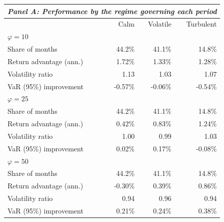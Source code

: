 \begin{tabular*}{\textwidth}{l@{\extracolsep{\fill}}rrr}
\toprule
\multicolumn{4}{c}{\textit{Panel A: Performance by the regime governing each period}} \\
\midrule
 & Calm & Volatile & Turbulent \\
\midrule
\multicolumn{4}{l}{\textit{$\varphi = 10$}} \\
\midrule
Share of months & 44.2\% & 41.1\% & 14.8\% \\
Return advantage (ann.) & 1.72\% & 1.33\% & 1.28\% \\
Volatility ratio & 1.13 & 1.03 & 1.07 \\
VaR (95\%) improvement & -0.57\% & -0.06\% & -0.54\% \\
\midrule
\multicolumn{4}{l}{\textit{$\varphi = 25$}} \\
\midrule
Share of months & 44.2\% & 41.1\% & 14.8\% \\
Return advantage (ann.) & 0.42\% & 0.83\% & 1.24\% \\
Volatility ratio & 1.00 & 0.99 & 1.03 \\
VaR (95\%) improvement & 0.02\% & 0.17\% & -0.08\% \\
\midrule
\multicolumn{4}{l}{\textit{$\varphi = 50$}} \\
\midrule
Share of months & 44.2\% & 41.1\% & 14.8\% \\
Return advantage (ann.) & -0.30\% & 0.39\% & 0.86\% \\
Volatility ratio & 0.94 & 0.96 & 0.94 \\
VaR (95\%) improvement & 0.21\% & 0.24\% & 0.38\% \\
\midrule[\heavyrulewidth]
\end{tabular*}

